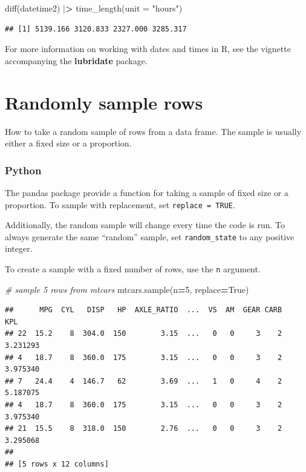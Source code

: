 \documentclass[
]{book}
\newenvironment{Shaded}{\begin{snugshade}}{\end{snugshade}}
\newcommand{\AttributeTok}[1]{\textcolor[rgb]{0.77,0.63,0.00}{#1}}
\newcommand{\CommentTok}[1]{\textcolor[rgb]{0.56,0.35,0.01}{\textit{#1}}}
\newcommand{\DecValTok}[1]{\textcolor[rgb]{0.00,0.00,0.81}{#1}}
\newcommand{\ErrorTok}[1]{\textcolor[rgb]{0.64,0.00,0.00}{\textbf{#1}}}
\newcommand{\FunctionTok}[1]{\textcolor[rgb]{0.00,0.00,0.00}{#1}}
\newcommand{\NormalTok}[1]{#1}
\newcommand{\OperatorTok}[1]{\textcolor[rgb]{0.81,0.36,0.00}{\textbf{#1}}}
\newcommand{\SpecialCharTok}[1]{\textcolor[rgb]{0.00,0.00,0.00}{#1}}
\newcommand{\StringTok}[1]{\textcolor[rgb]{0.31,0.60,0.02}{#1}}
\newcommand{\VariableTok}[1]{\textcolor[rgb]{0.00,0.00,0.00}{#1}}
\begin{document}
\begin{Shaded}
\begin{Highlighting}[]
\FunctionTok{diff}\NormalTok{(datetime2) }\SpecialCharTok{|}\ErrorTok{\textgreater{}} \FunctionTok{time\_length}\NormalTok{(}\AttributeTok{unit =} \StringTok{"hours"}\NormalTok{)}
\end{Highlighting}
\end{Shaded}

\begin{verbatim}
## [1] 5139.166 3120.833 2327.000 3285.317
\end{verbatim}

For more information on working with dates and times in R, see the vignette accompanying the \textbf{lubridate} package.

\hypertarget{randomly-sample-rows}{%
\section{Randomly sample rows}\label{randomly-sample-rows}}

How to take a random sample of rows from a data frame. The sample is usually either a fixed size or a proportion.

\hypertarget{python-29}{%
\subsubsection*{Python}\label{python-29}}

The pandas package provide a function for taking a sample of fixed size or a proportion. To sample with replacement, set \texttt{replace\ =\ TRUE}.

Additionally, the random sample will change every time the code is run. To always generate the same ``random'' sample, set \texttt{random\_state} to any positive integer.

To create a sample with a fixed number of rows, use the \texttt{n} argument.

\begin{Shaded}
\begin{Highlighting}[]
\CommentTok{\# sample 5 rows from mtcars}
\NormalTok{mtcars.sample(n}\OperatorTok{=}\DecValTok{5}\NormalTok{, replace}\OperatorTok{=}\VariableTok{True}\NormalTok{)}
\end{Highlighting}
\end{Shaded}

\begin{verbatim}
##      MPG  CYL   DISP   HP  AXLE_RATIO  ...  VS  AM  GEAR CARB       KPL
## 22  15.2    8  304.0  150        3.15  ...   0   0     3    2  3.231293
## 4   18.7    8  360.0  175        3.15  ...   0   0     3    2  3.975340
## 7   24.4    4  146.7   62        3.69  ...   1   0     4    2  5.187075
## 4   18.7    8  360.0  175        3.15  ...   0   0     3    2  3.975340
## 21  15.5    8  318.0  150        2.76  ...   0   0     3    2  3.295068
## 
## [5 rows x 12 columns]
\end{verbatim}
\end{document}
